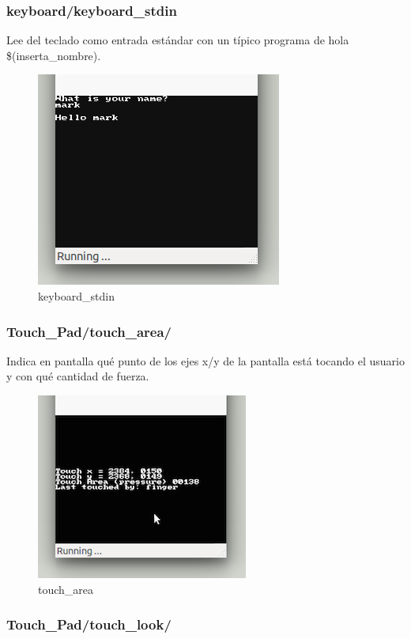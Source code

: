\subsubsection{keyboard/keyboard\_stdin}

Lee del teclado como entrada estándar con un típico programa de hola \$(inserta\_nombre).

\begin{figure}[H] 
\centering
\includegraphics[scale=0.75]{P2Media/keyboard_stdin.png}
\caption{keyboard\_stdin}
\end{figure}

\subsubsection{Touch\_Pad/touch\_area/}

Indica en pantalla qué punto de los ejes x/y de la pantalla está tocando el usuario y con qué cantidad de fuerza.

\begin{figure}[H] 
\centering
\includegraphics[scale=0.75]{P2Media/touch_area.png}
\caption{touch\_area}
\end{figure}

\subsubsection{Touch\_Pad/touch\_look/}

